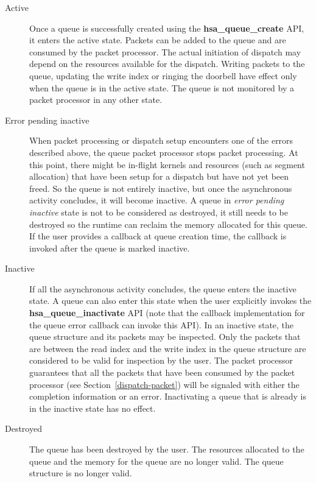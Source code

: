 \documentclass[draft]{book}
\newcommand{\reffun}[1]{\textbf{#1}}
\begin{document}
\begin{description}
\item[Active] Once a queue is successfully created using the
  \reffun{hsa_queue_create} API, it enters the active state. Packets can be
  added to the queue and are consumed by the packet processor. The actual
  initiation of dispatch may depend on the resources available for the
  dispatch. Writing packets to the queue, updating the write index or ringing
  the doorbell have effect only when the queue is in the active state. The queue
  is not monitored by a packet processor in any other state.

\item[Error pending inactive] When packet processing or dispatch setup
  encounters one of the errors described above, the queue packet processor stops
  packet processing. At this point, there might be in-flight kernels and
  resources (such as segment allocation) that have been setup for a dispatch but
  have not yet been freed. So the queue is not entirely inactive, but once the
  asynchronous activity concludes, it will become inactive. A queue in
  \emph{error pending inactive} state is not to be considered as destroyed, it
  still needs to be destroyed so the runtime can reclaim the memory allocated
  for this queue. If the user provides a callback at queue creation time, the
  callback is invoked after the queue is marked inactive.

\item[Inactive] If all the asynchronous activity concludes, the queue enters the
  inactive state. A queue can also enter this state when the user explicitly
  invokes the \reffun{hsa_queue_inactivate} API (note that the callback
  implementation for the queue error callback can invoke this API). In an
  inactive state, the queue structure and its packets may be inspected. Only the
  packets that are between the read index and the write index in the queue
  structure are considered to be valid for inspection by the user. The packet
  processor guarantees that all the packets that have been consumed by the
  packet processor (see Section~\ref{dispatch-packet}) will be signaled with
  either the completion information or an error. Inactivating a queue that is
  already is in the inactive state has no effect.
\item[Destroyed] The queue has been destroyed by the user. The resources
  allocated to the queue and the memory for the queue are no longer valid. The
  queue structure is no longer valid.
\end{description}
\end{document}
